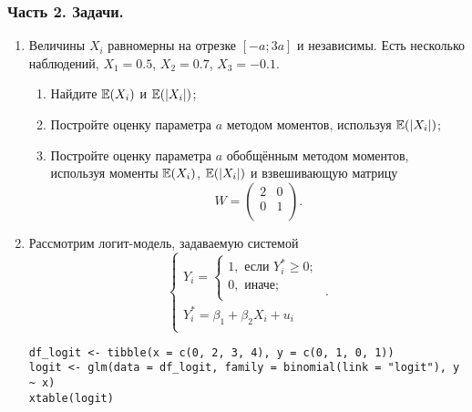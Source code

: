\documentclass[12pt, a4paper]{article}
\theoremstyle{definition}
\begin{document}
%






\subsubsection*{Часть 2. Задачи.}


\begin{enumerate}

\item Величины $X_i$ равномерны на отрезке $[-a; 3a]$ и независимы. Есть несколько наблюдений, $X_1=0.5$, $X_2=0.7$, $X_3=-0.1$.

\begin{enumerate}
\item Найдите $\mathbb{E}(X_i)$ и $\mathbb{E}(|X_i|)$;
\item Постройте оценку параметра $a$ методом моментов, используя $\mathbb{E}(|X_i|)$;
\item Постройте оценку параметра $a$ обобщённым методом моментов, используя моменты $\mathbb{E}(X_i)$, $\mathbb{E}(|X_i|)$ и взвешивающую матрицу
\[
W=\begin{pmatrix}
2 & 0 \\
0 & 1 \\
\end{pmatrix}.
\]
\end{enumerate}


\item Рассмотрим логит-модель, задаваемую системой
\[
\begin{cases}
Y_i =
\begin{cases}
1, \text{ если } Y_i^* \geq 0; \\
0, \text{ иначе;} \\
\end{cases} \\
Y_i^* = \beta_1 + \beta_2 X_i + u_i \\
\end{cases}.
\]

\begin{verbatim}
df_logit <- tibble(x = c(0, 2, 3, 4), y = c(0, 1, 0, 1))
logit <- glm(data = df_logit, family = binomial(link = "logit"), y ~ x)
xtable(logit)
\end{verbatim}



\end{enumerate}
\end{document}
